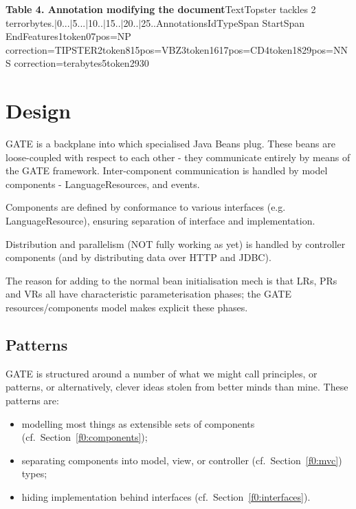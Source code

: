 {\bf Table 4. Annotation modifying the document}TextTopster tackles 2 terrorbytes.\mbox{$|$}0...\mbox{$|$}5...\mbox{$|$}10..\mbox{$|$}15..\mbox{$|$}20..\mbox{$|$}25..AnnotationsIdTypeSpan
            StartSpan EndFeatures1token07pos=NP
            correction=TIPSTER2token815pos=VBZ3token1617pos=CD4token1829pos=NNS correction=terabytes5token2930~%

\section{Design}

\label{f0:design}
GATE is a backplane into which specialised Java Beans plug.
These beans are loose-coupled with respect to each other - they communicate
entirely by means of the GATE framework.
Inter-component communication is handled by model components -
LanguageResources, and events.

Components are defined by conformance to various interfaces (e.g.
LanguageResource), ensuring
separation of interface and implementation.

Distribution and parallelism (NOT fully working as yet)
is handled by controller components (and by distributing data
over HTTP and JDBC).

The reason for adding to the normal bean initialisation mech is that
LRs, PRs and VRs all have characteristic parameterisation
phases; the GATE resources/components model makes explicit these phases.

\subsection{Patterns}


GATE is structured around a number of what we might call principles, or
patterns, or alternatively, clever ideas stolen from better minds than
mine. These patterns are:
\begin{itemize}
\item 
modelling most things as extensible sets of components (cf.\ Section~\ref{f0:components});
\item 
separating components into
model, view, or controller (cf.\ Section~\ref{f0:mvc}) types;
\item 
hiding implementation behind interfaces (cf.\ Section~\ref{f0:interfaces}).
\end{itemize}

